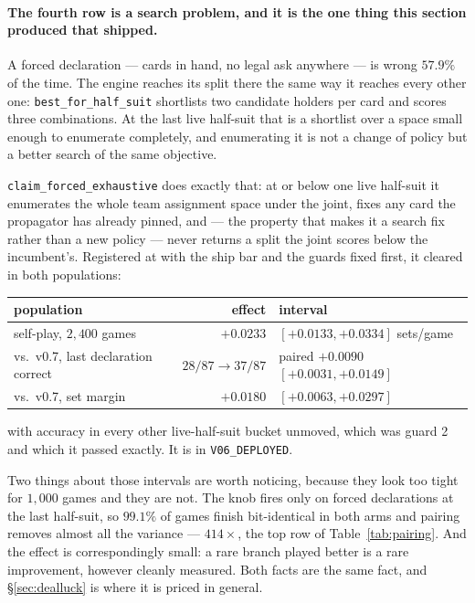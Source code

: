 \documentclass[11pt,a4paper]{article}
\begin{document}
\paragraph{The fourth row is a search problem, and it is the one thing this
section produced that shipped.} A forced declaration --- cards in hand, no legal
ask anywhere --- is wrong $57.9\%$ of the time. The engine reaches its split
there the same way it reaches every other one: \texttt{best\_for\_half\_suit}
shortlists two candidate holders per card and scores three combinations. At the
last live half-suit that is a shortlist over a space small enough to enumerate
completely, and enumerating it is not a change of policy but a better search of
the same objective.

\texttt{claim\_forced\_exhaustive} does exactly that: at or below one live
half-suit it enumerates the whole team assignment space under the joint, fixes
any card the propagator has already pinned, and --- the property that makes it a
search fix rather than a new policy --- never returns a split the joint scores
below the incumbent's. Registered at  with
the ship bar and the guards fixed first, it cleared in both populations:

\begin{center}
\small
\begin{tabular}{lrl}
\toprule
population & effect & interval \\
\midrule
self-play, $2{,}400$ games & $+0.0233$ & $[+0.0133, +0.0334]$ sets/game \\
vs.\ v0.7, last declaration correct & $28/87 \to 37/87$ & paired $+0.0090$ $[+0.0031, +0.0149]$ \\
vs.\ v0.7, set margin & $+0.0180$ & $[+0.0063, +0.0297]$ \\
\bottomrule
\end{tabular}
\end{center}

\noindent with accuracy in every other live-half-suit bucket unmoved, which was
guard 2 and which it passed exactly. It is in \texttt{V06\_DEPLOYED}.

Two things about those intervals are worth noticing, because they look too
tight for $1{,}000$ games and they are not. The knob fires only on forced
declarations at the last half-suit, so $99.1\%$ of games finish bit-identical
in both arms and pairing removes almost all the variance --- $414\times$, the
top row of Table~\ref{tab:pairing}. And the effect is correspondingly small:
a rare branch played better is a rare improvement, however cleanly measured.
Both facts are the same fact, and \S\ref{sec:dealluck} is where it is priced in
general.
\end{document}
